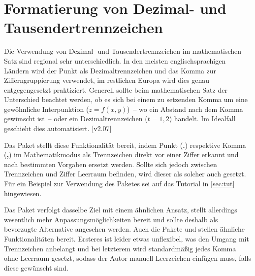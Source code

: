 \section[%
  Das Paket \Package{mathswap} -- Dezimal- und Tausendertrennzeichen%
]{%
  Formatierung von Dezimal- und Tausendertrennzeichen%
}

\begin{DeclareEntity}{}
Die Verwendung von Dezimal- und Tausendertrennzeichen im mathematischen Satz 
sind regional sehr unterschiedlich. In den meisten englischsprachigen Ländern 
wird der Punkt als Dezimaltrennzeichen und das Komma zur Zifferngruppierung 
verwendet, im restlichen Europa wird dies genau entgegengesetzt praktiziert.
Generell sollte beim mathematischen Satz der 
Unterschied beachtet werden, ob es sich bei einem zu setzenden Komma um eine 
gewöhnliche Interpunktion ($z=f(x,y)$)~-- wo ein Abstand nach dem Komma 
gewünscht ist~-- oder ein Dezimaltrennzeichen ($t=1,\!2$) handelt. Im Idealfall 
geschieht dies automatisiert.
[v2.07]

Das Paket  stellt diese Funktionalität bereit, indem Punkt 
(\:\textbf{.}\:) respektive Komma (\:\textbf{,}\:) im Mathematikmodus als 
Trennzeichen direkt vor einer Ziffer erkannt und nach bestimmten Vorgaben 
ersetzt werden. Sollte sich jedoch zwischen Trennzeichen und Ziffer Leerraum 
befinden, wird dieser als solcher auch gesetzt. Für ein Beispiel zur Verwendung 
des Paketes sei auf das Tutorial  in \autoref{sec:tut} 
hingewiesen.

Das Paket  verfolgt dasselbe Ziel mit einem ähnlichen 
Ansatz, stellt allerdings wesentlich mehr Anpassungsmöglichkeiten bereit und 
sollte deshalb als bevorzugte Alternative angesehen werden. Auch die Pakete 
 und  stellen ähnliche Funktionalitäten 
bereit. Ersteres ist leider etwas unflexibel, was den Umgang mit Trennzeichen 
anbelangt und bei letzterem wird standardmäßig jedes Komma ohne Leerraum 
gesetzt, sodass der Autor manuell Leerzeichen einfügen muss, falls diese 
gewünscht sind. 

\begin{Declaration}
  {}
\begin{Declaration}
  {}
\printdeclarationlist


\end{Declaration}
\end{Declaration}
\end{DeclareEntity}
